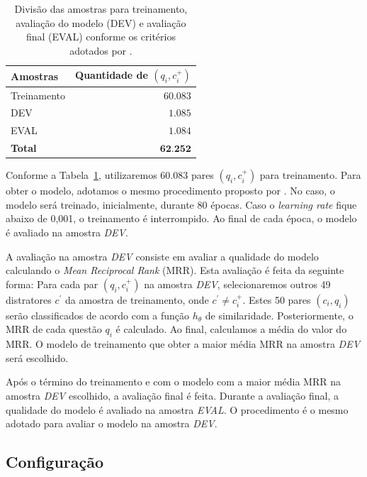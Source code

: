\documentclass[12pt]{article}
\begin{document}
\begin{table}[h]
\centering
\begin{tabular}{ p{3cm} r  }
 \hline
 \textbf{Amostras} & \textbf{Quantidade de $(q_{i}, c_{i}^{+})$}\\
 \hline
 Treinamento & $60.083$\\
 
 DEV & $1.085$ \\
 
 EVAL & $1.084$\\
 \hline
 \textbf{Total} & $\textbf{62.252}$\\
 \hline
\end{tabular}
\caption{Divisão das amostras para treinamento, avaliação do modelo (DEV) e avaliação final (EVAL) conforme os critérios adotados por \cite{iyer-etal-2016-summarizing}.}
\label{table:divisao-amostras}
\end{table}

Conforme a Tabela~\ref{table:divisao-amostras}, utilizaremos 60.083 pares $(q_{i}, c_{i}^{+})$ para treinamento. Para obter o modelo, adotamos o mesmo procedimento proposto por \cite{iyer-etal-2016-summarizing}. No caso, o modelo será treinado, inicialmente, durante 80 épocas. Caso o \textit{learning rate} fique abaixo de 0,001, o treinamento é interrompido. Ao final de cada época, o modelo é avaliado na amostra \emph{DEV}. 


A avaliação na amostra \emph{DEV} consiste em avaliar a qualidade do modelo calculando o \textit{Mean Reciprocal Rank} (MRR). Esta avaliação é feita da seguinte forma:
 Para cada par $(q_{i}, c_{i}^{+})$ na amostra \emph{DEV}, selecionaremos outros 49 distratores $c^{'}$ da amostra de treinamento, onde $c^{'} \neq c_{i}^{+}$. Estes 50 pares $(c_{i}, q_{i})$ serão classificados de acordo com a função $h_{\theta}$ de similaridade. Posteriormente, o MRR de cada questão $q_{i}$ é calculado. Ao final, calculamos a média do valor do MRR. O modelo de treinamento que obter a maior média MRR na amostra \emph{DEV} será escolhido. 
 
 
 
 Após o término do treinamento e com o modelo com a maior média MRR na amostra \emph{DEV} escolhido, a avaliação final é feita. Durante a avaliação final, a qualidade do modelo é avaliado na amostra \emph{EVAL}. O procedimento é o mesmo adotado para avaliar o modelo na amostra \emph{DEV}.


\subsection{Configuração}
\end{document}
